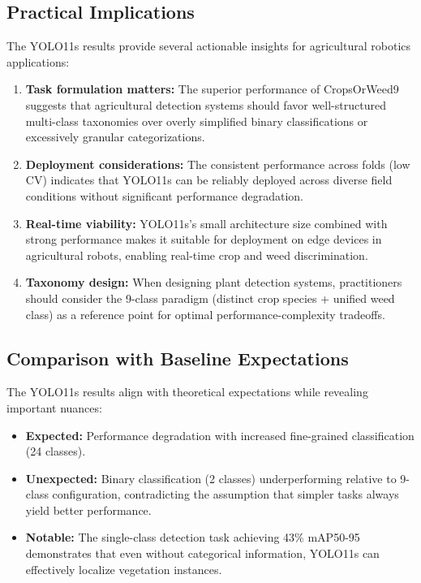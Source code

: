 \subsection{Practical Implications}

The YOLO11s results provide several actionable insights for agricultural robotics applications:

\begin{enumerate}
    \item \textbf{Task formulation matters:} The superior performance of CropsOrWeed9 suggests that agricultural detection systems should favor well-structured multi-class taxonomies over overly simplified binary classifications or excessively granular categorizations.
    
    \item \textbf{Deployment considerations:} The consistent performance across folds (low CV) indicates that YOLO11s can be reliably deployed across diverse field conditions without significant performance degradation.
    
    \item \textbf{Real-time viability:} YOLO11s's small architecture size combined with strong performance makes it suitable for deployment on edge devices in agricultural robots, enabling real-time crop and weed discrimination.
    
    \item \textbf{Taxonomy design:} When designing plant detection systems, practitioners should consider the 9-class paradigm (distinct crop species + unified weed class) as a reference point for optimal performance-complexity tradeoffs.
\end{enumerate}

\subsection{Comparison with Baseline Expectations}

The YOLO11s results align with theoretical expectations while revealing important nuances:

\begin{itemize}
    \item \textbf{Expected:} Performance degradation with increased fine-grained classification (24 classes).
    \item \textbf{Unexpected:} Binary classification (2 classes) underperforming relative to 9-class configuration, contradicting the assumption that simpler tasks always yield better performance.
    \item \textbf{Notable:} The single-class detection task achieving 43\% mAP50-95 demonstrates that even without categorical information, YOLO11s can effectively localize vegetation instances.
\end{itemize}



